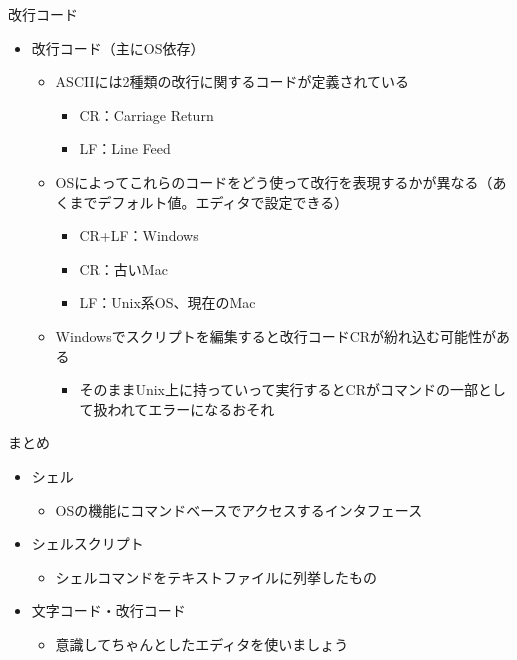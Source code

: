 \documentclass[12pt,aspectratio=169]{beamer}
\begin{document}
\begin{frame}{改行コード}
  \begin{itemize}
    \item 改行コード（主にOS依存）
      \begin{itemize}
        \item ASCIIには2種類の改行に関するコードが定義されている
          \begin{itemize}
            \item CR：Carriage Return
            \item LF：Line Feed
          \end{itemize}
        \item OSによってこれらのコードをどう使って改行を表現するかが異なる（あくまでデフォルト値。エディタで設定できる）
          \begin{itemize}
            \item CR+LF：Windows
            \item CR：古いMac
            \item LF：Unix系OS、現在のMac
          \end{itemize}
        \item Windowsでスクリプトを編集すると改行コードCRが紛れ込む可能性がある
          \begin{itemize}
            \item そのままUnix上に持っていって実行するとCRがコマンドの一部として扱われてエラーになるおそれ
          \end{itemize}

      \end{itemize}

  \end{itemize}

\end{frame}


\begin{frame}{まとめ}

  \begin{itemize}
    \item シェル
      \begin{itemize}
        \item OSの機能にコマンドベースでアクセスするインタフェース
      \end{itemize}
    \item シェルスクリプト
      \begin{itemize}
        \item シェルコマンドをテキストファイルに列挙したもの
      \end{itemize}
    \item 文字コード・改行コード
      \begin{itemize}
        \item 意識してちゃんとしたエディタを使いましょう
      \end{itemize}

  \end{itemize}


\end{frame}
\end{document}
